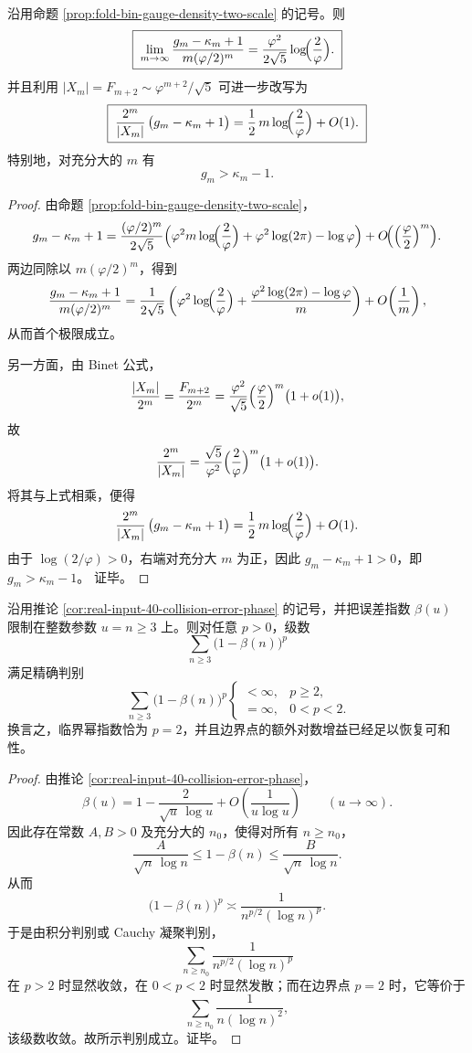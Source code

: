 \begin{theorem}[规范体积密度与纤维信息项之间的线性响应斜率]\label{thm:xi-time-part65-binfold-gauge-linear-response-slope}
沿用命题 \ref{prop:fold-bin-gauge-density-two-scale} 的记号。则
\[
\boxed{\;
\lim_{m\to\infty}
\frac{g_m-\kappa_m+1}{m(\varphi/2)^m}
=
\frac{\varphi^2}{2\sqrt5}\log\!\Bigl(\frac{2}{\varphi}\Bigr).\;}
\]
并且利用 \(|X_m|=F_{m+2}\sim \varphi^{m+2}/\sqrt5\) 可进一步改写为
\[
\boxed{\;
\frac{2^m}{|X_m|}\,\bigl(g_m-\kappa_m+1\bigr)
=
\frac12\,m\log\!\Bigl(\frac{2}{\varphi}\Bigr)+O(1).\;}
\]
特别地，对充分大的 \(m\) 有
\[
g_m>\kappa_m-1.
\]
\end{theorem}
\begin{proof}
由命题 \ref{prop:fold-bin-gauge-density-two-scale}，
\[
g_m-\kappa_m+1
=
\frac{(\varphi/2)^m}{2\sqrt5}
\Bigl(
\varphi^2 m\log\!\Bigl(\frac{2}{\varphi}\Bigr)
+\varphi^2\log(2\pi)-\log\varphi
\Bigr)
+O\!\Bigl(\Bigl(\frac{\varphi}{2}\Bigr)^m\Bigr).
\]
两边同除以 \(m(\varphi/2)^m\)，得到
\[
\frac{g_m-\kappa_m+1}{m(\varphi/2)^m}
=
\frac{1}{2\sqrt5}
\left(
\varphi^2\log\!\Bigl(\frac{2}{\varphi}\Bigr)
+\frac{\varphi^2\log(2\pi)-\log\varphi}{m}
\right)
+O\!\left(\frac1m\right),
\]
从而首个极限成立。

另一方面，由 Binet 公式，
\[
\frac{|X_m|}{2^m}
=
\frac{F_{m+2}}{2^m}
=
\frac{\varphi^2}{\sqrt5}\Bigl(\frac{\varphi}{2}\Bigr)^m\bigl(1+o(1)\bigr),
\]
故
\[
\frac{2^m}{|X_m|}
=
\frac{\sqrt5}{\varphi^2}\Bigl(\frac{2}{\varphi}\Bigr)^m\bigl(1+o(1)\bigr).
\]
将其与上式相乘，便得
\[
\frac{2^m}{|X_m|}\,\bigl(g_m-\kappa_m+1\bigr)
=
\frac12\,m\log\!\Bigl(\frac{2}{\varphi}\Bigr)+O(1).
\]
由于 \(\log(2/\varphi)>0\)，右端对充分大 \(m\) 为正，因此 \(g_m-\kappa_m+1>0\)，即
\(
g_m>\kappa_m-1
\)。
证毕。
\end{proof}

\begin{theorem}[纯碰撞误差指数缺口的 \texorpdfstring{$\ell^p$}{lp} 临界幂为 \texorpdfstring{$p=2$}{p=2}]\label{thm:xi-time-part65-collision-error-gap-lp-threshold}
沿用推论 \ref{cor:real-input-40-collision-error-phase} 的记号，并把误差指数 \(\beta(u)\) 限制在整数参数 \(u=n\ge 3\) 上。则对任意 \(p>0\)，级数
\[
\sum_{n\ge 3}\bigl(1-\beta(n)\bigr)^p
\]
满足精确判别
\[
\boxed{\;
\sum_{n\ge 3}\bigl(1-\beta(n)\bigr)^p
\begin{cases}
<\infty,& p\ge 2,\\[2pt]
=\infty,& 0<p<2.
\end{cases}}
\]
换言之，临界幂指数恰为 \(p=2\)，并且边界点的额外对数增益已经足以恢复可和性。
\end{theorem}
\begin{proof}
由推论 \ref{cor:real-input-40-collision-error-phase}，
\[
\beta(u)
=
1-\frac{2}{\sqrt u\,\log u}
+O\!\left(\frac{1}{u\log u}\right)
\qquad (u\to\infty).
\]
因此存在常数 \(A,B>0\) 及充分大的 \(n_0\)，使得对所有 \(n\ge n_0\)，
\[
\frac{A}{\sqrt n\,\log n}
\le
1-\beta(n)
\le
\frac{B}{\sqrt n\,\log n}.
\]
从而
\[
\bigl(1-\beta(n)\bigr)^p
\asymp
\frac{1}{n^{p/2}(\log n)^p}.
\]
于是由积分判别或 Cauchy 凝聚判别，
\[
\sum_{n\ge n_0}\frac{1}{n^{p/2}(\log n)^p}
\]
在 \(p>2\) 时显然收敛，在 \(0<p<2\) 时显然发散；而在边界点 \(p=2\) 时，它等价于
\[
\sum_{n\ge n_0}\frac{1}{n(\log n)^2},
\]
该级数收敛。故所示判别成立。证毕。
\end{proof}

